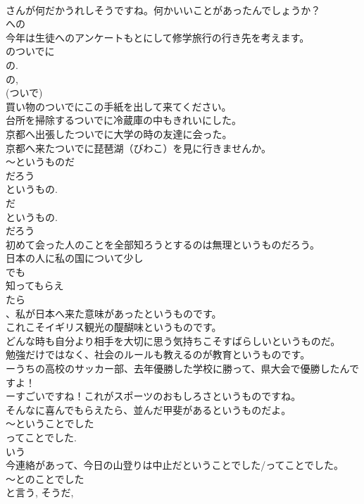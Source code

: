 \documentclass[8pt]{extreport}
\begin{document}
\begin{CJK}{UTF8}{min}
\\	さんが何だかうれしそうですね。何かいいことがあったんでしょうか？	
\\	への
\\	今年は生徒へのアンケートもとにして修学旅行の行き先を考えます。	
\\	のついでに
\\	の. 
\\	の, 
\\	(ついで) 
\\	買い物のついでにこの手紙を出して来てください。
\\	台所を掃除するついでに冷蔵庫の中もきれいにした。
\\	京都へ出張したついでに大学の時の友達に会った。
\\	京都へ来たついでに琵琶湖（びわこ）を見に行きませんか。
\\	～というものだ
\\	だろう 
\\	というもの. 
\\	だ 
\\	というもの.
\\	だろう 
\\	初めて会った人のことを全部知ろうとするのは無理というものだろう。
\\	日本の人に私の国について少し
\\	でも
\\	知ってもらえ
\\	たら
\\	、私が日本へ来た意味があったというものです。
\\	これこそイギリス観光の醍醐味というものです。
\\	どんな時も自分より相手を大切に思う気持ちこそすばらしいというものだ。
\\	勉強だけではなく、社会のルールも教えるのが教育というものです。
\\	ーうちの高校のサッカー部、去年優勝した学校に勝って、県大会で優勝したんですよ！
\\	ーすごいですね！これがスポーツのおもしろさというものですね。
\\	そんなに喜んでもらえたら、並んだ甲斐があるというものだよ。
\\	～ということでした
\\	ってことでした. 
\\	いう 
\\	今連絡があって、今日の山登りは中止だということでした/ってことでした。
\\	～とのことでした
\\	と言う, そうだ, 

\end{CJK}
\end{document}
